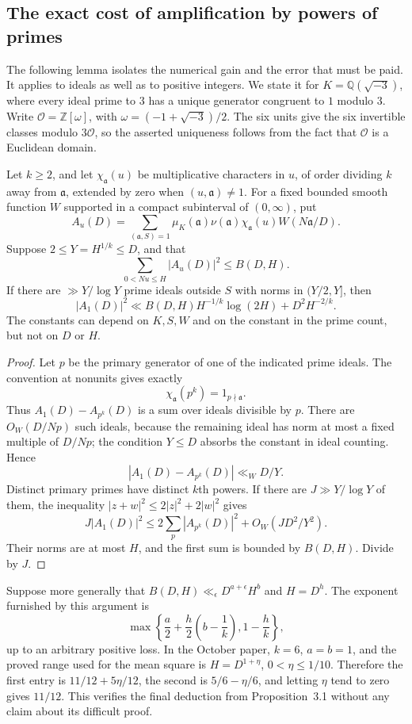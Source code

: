 \subsection{The exact cost of amplification by powers of primes}

The following lemma isolates the numerical gain and the error that
must be paid. It applies to ideals as well as to positive integers.
We state it for $K=\mathbb Q(\sqrt{-3})$, where every ideal prime
to $3$ has a unique generator congruent to $1$ modulo $3$.
Write $\mathcal O=\mathbb Z[\omega]$, with
$\omega=(-1+\sqrt{-3})/2$. The six units give the six invertible
classes modulo $3\mathcal O$, so the asserted uniqueness follows
from the fact that $\mathcal O$ is a Euclidean domain.

\begin{lemma}
\label{lem:qrh-amplification}
Let $k\ge2$, and let $\chi_{\mathfrak a}(u)$ be multiplicative
characters in $u$, of order dividing $k$ away from
$\mathfrak a$, extended by zero when $(u,\mathfrak a)\ne1$.
For a fixed bounded smooth function $W$ supported in a compact
subinterval of $(0,\infty)$, put
\[
 A_u(D)=\sum_{(\mathfrak a,S)=1}
 \mu_K(\mathfrak a)\nu(\mathfrak a)
 \chi_{\mathfrak a}(u)W(N\mathfrak a/D).
\]
Suppose $2\le Y=H^{1/k}\le D$, and that
\[
 \sum_{0<Nu\le H}|A_u(D)|^2\le B(D,H).
\]
If there are $\gg Y/\log Y$ prime ideals outside $S$ with norms
in $(Y/2,Y]$, then
\[
 |A_1(D)|^2\ll
       B(D,H)H^{-1/k}\log(2H)+D^2H^{-2/k}.
\]
The constants can depend on $K,S,W$ and on the constant in the
prime count, but not on $D$ or $H$.
\end{lemma}
\begin{proof}
Let $p$ be the primary generator of one of the indicated prime
ideals. The convention at nonunits gives exactly
\[
 \chi_{\mathfrak a}(p^k)=1_{p\nmid\mathfrak a}.
\]
Thus $A_1(D)-A_{p^k}(D)$ is a sum over ideals divisible by $p$.
There are $O_W(D/Np)$ such ideals, because the remaining ideal
has norm at most a fixed multiple of $D/Np$; the condition
$Y\le D$ absorbs the constant in ideal counting. Hence
\[
 |A_1(D)-A_{p^k}(D)|\ll_W D/Y.
\]
Distinct primary primes have distinct $k$th powers. If there
are $J\gg Y/\log Y$ of them, the inequality
$|z+w|^2\le2|z|^2+2|w|^2$ gives
\[
 J|A_1(D)|^2\le
 2\sum_p|A_{p^k}(D)|^2+O_W(JD^2/Y^2).
\]
Their norms are at most $H$, and the first sum is bounded by
$B(D,H)$. Divide by $J$.
\end{proof}

Suppose more generally that
$B(D,H)\ll_\epsilon D^{a+\epsilon}H^b$ and $H=D^h$.
The exponent furnished by this argument is
\begin{equation}\label{eq:qrh-general-exponent}
 \max\left\{\frac a2+\frac h2\left(b-\frac1k\right),
                    1-\frac hk\right\},
\end{equation}
up to an arbitrary positive loss. In the October paper,
$k=6$, $a=b=1$, and the proved range used for the mean square
is $H=D^{1+\eta}$, $0<\eta\le1/10$. Therefore the first
entry is $11/12+5\eta/12$, the second is
$5/6-\eta/6$, and letting $\eta$ tend to zero gives $11/12$.
This verifies the final deduction from Proposition~3.1 without
any claim about its difficult proof.

